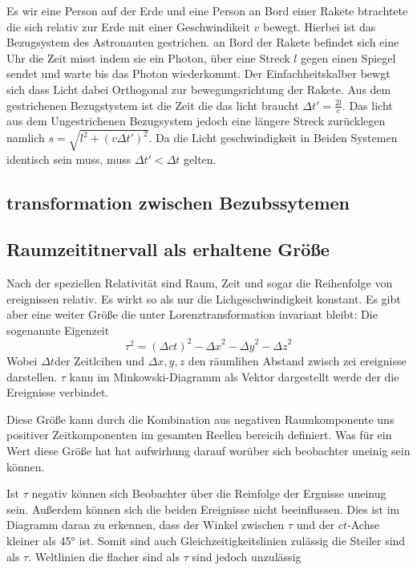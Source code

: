 \documentclass[12pt]{article}
\begin{document}
Es wir eine Person auf der Erde und eine Person an Bord einer Rakete btrachtete die sich relativ zur Erde mit einer Geschwindikeit $v$ bewegt.
Hierbei ist das Bezugsystem des Astronauten gestrichen.
an Bord der Rakete befindet sich eine Uhr die Zeit misst indem sie ein Photon, über eine Streck $l$ gegen einen Spiegel sendet und warte bis das Photon wiederkommt.
Der Einfachheitskalber bewgt sich dass Licht dabei Orthogonal zur bewegungsrichtung der Rakete.
Aus dem gestrichenen Bezugstystem ist die Zeit die das licht braucht $\Delta t' = \frac{2l}{c}$.
Das licht aus dem Ungestrichenen Bezugsystem jedoch eine längere Streck zurücklegen namlich $s = \sqrt{l^2 + (v \Delta t')^2}$.
Da die Licht geschwindigkeit in Beiden Systemen identisch sein muss, muss $\Delta t' < \Delta t$ gelten.


\subsection{transformation zwischen Bezubssytemen}
\subsection{Raumzeititnervall als erhaltene Größe}
Nach der speziellen Relativität sind Raum, Zeit und sogar die Reihenfolge von ereignissen relativ.
Es wirkt so als nur die Lichgeschwindigkeit konstant.
Es gibt aber eine weiter Größe die unter Lorenztransformation invariant bleibt:
Die sogenannte Eigenzeit
\begin{equation}
\tau^2 = (\Delta ct)^2 - {\Delta x}^2 - {\Delta y}^2 - {\Delta z}^2
\end{equation}
Wobei $\Delta t$der Zeitlcihen und $\Delta x, y, z$ den räumlihen Abstand zwisch zei ereignisse darstellen.
$\tau$ kann im Minkowski-Diagramm als Vektor dargestellt werde der die Ereignisse verbindet.

Diese Größe kann durch die Kombination aus negativen Raumkomponente uns positiver Zeitkomponenten im gesamten Reellen bereicih definiert.
Was für ein Wert diese Größe hat hat aufwirhung darauf worüber sich beobachter uneinig sein können.

Ist $\tau$ negativ können sich Beobachter über die Reinfolge der Ergnisse uneinug sein.
Außerdem können sich die beiden Ereignisse nicht beeinflussen.
Dies ist im Diagramm daran zu erkennen, dass der Winkel zwischen $\tau$ und der $ct$-Achse kleiner als \ang{45} ist.
Somit sind auch Gleichzeitigkeitslinien zulässig die Steiler sind als $\tau$.
Weltlinien die flacher sind als $\tau$ sind jedoch unzulässig
\end{document}
